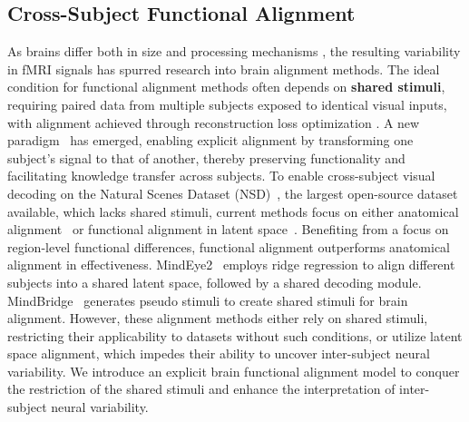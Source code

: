 \subsection{Cross-Subject Functional Alignment}
As brains differ both in size and processing mechanisms \cite{nsd, finn2017brain}, the resulting variability in fMRI signals has spurred research into brain alignment methods.
The ideal condition for functional alignment methods often depends on \textbf{shared stimuli}, 
requiring paired data from multiple subjects exposed to identical visual inputs, with alignment achieved through reconstruction loss optimization \cite{difumo, rastegarnia2023brain}.
A new paradigm~\cite{Bazeille2019, fgwu, Thual2023, througtheireye} has emerged, enabling explicit alignment by transforming one subject's signal to that of another, thereby preserving functionality and facilitating knowledge transfer across subjects.
To enable cross-subject visual decoding on the Natural Scenes Dataset (NSD)~\cite{nsd}, the largest open-source dataset available, which lacks shared stimuli, 
current methods focus on either anatomical alignment~\cite{Bao2024, mindshot, shenneuro} or functional alignment in latent space~\cite{mindeyev1, mindeyev2, mindbridge, mindtuner}.
Benefiting from a focus on region-level functional differences, functional alignment outperforms anatomical alignment in effectiveness.
MindEye2~\cite{mindeyev2} employs ridge regression to align different subjects into a shared latent space, followed by a shared decoding module.
MindBridge~\cite{mindbridge} generates pseudo stimuli to create shared stimuli for brain alignment.
However, these alignment methods either rely on shared stimuli, restricting their applicability to datasets without such conditions, or utilize latent space alignment, which impedes their ability to uncover inter-subject neural variability.
We introduce an explicit brain functional alignment model to conquer the restriction of the shared stimuli and enhance the interpretation of inter-subject neural variability.
